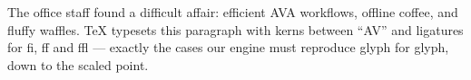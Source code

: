 \documentclass{article}
\begin{document}
The office staff found a difficult affair: efficient AVA workflows, offline
coffee, and fluffy waffles. TeX typesets this paragraph with kerns between
``AV'' and ligatures for fi, ff and ffl --- exactly the cases our engine must
reproduce glyph for glyph, down to the scaled point.
\end{document}
